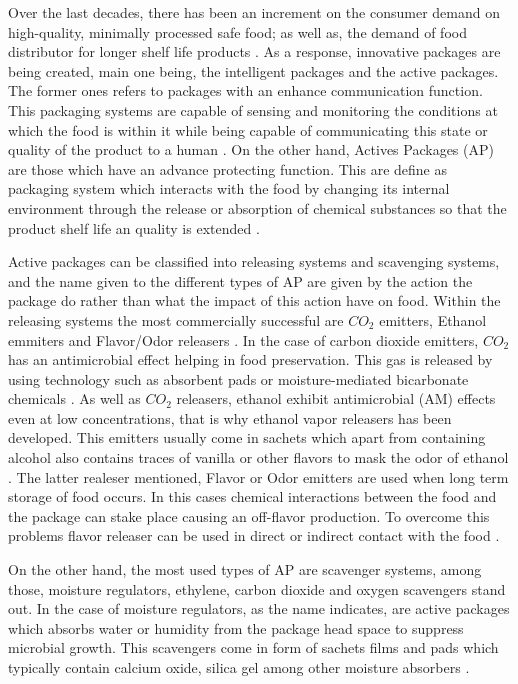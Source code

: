 \begin{refsection}
 Over the last decades, there has been an increment on the consumer demand on high-quality, minimally processed safe food; as well as, the demand of  food distributor for longer shelf life products \cite{Yildirim2018ActivePackaging}.  As a response, innovative packages are being created, main one being, the intelligent packages and the active packages.  The former ones refers to packages with an enhance communication function.  This packaging systems are capable of sensing and monitoring the conditions at which the food is within it while being capable of communicating this state or quality of the product to a human \cites{Yam2005IntelligentApplications}{Kruijf2002ActiveAspects}. On the other hand, Actives Packages (AP) are those which have an advance protecting function. This are define as packaging system which interacts with the food by changing its internal environment through the release or absorption of chemical substances so that the product shelf life an quality is extended \cites{brody2001active}{Yildirim2018ActivePackaging}.
 
 Active packages can be classified into releasing systems and scavenging systems, and the name given to the different types of AP are given by the action the package do rather than what the impact of this action have on food. Within the releasing systems the most commercially successful are $CO_2$ emitters, Ethanol emmiters and Flavor/Odor releasers \cites{robertson2016food}{PereiradeAbreu2012ActiveIndustry}. In the case of carbon dioxide emitters, $CO_2$  has an antimicrobial effect helping in food preservation. This  gas is released by using technology such as absorbent pads or moisture-mediated bicarbonate chemicals \cite{Emanuel2019FoodPerspective}. As well as $CO_2$ releasers, ethanol exhibit antimicrobial (AM) effects even at low concentrations, that is why ethanol vapor releasers has been developed. This emitters usually come in sachets which apart from containing alcohol also contains traces of vanilla or other flavors to mask the odor of ethanol \cite{robertson2016food}. The latter realeser mentioned, Flavor or Odor emitters are used when long term storage of food occurs. In this cases chemical interactions between the food and the package can stake place causing an off-flavor production. To overcome this problems flavor releaser can be used in direct or indirect contact with the food \cite{Ahmed2017AFoods}.
 
On the other hand, the most used types of AP are scavenger systems, among those, moisture regulators, ethylene, carbon dioxide and oxygen scavengers stand out. In the case of moisture regulators, as the name indicates, are active packages which absorbs water or humidity from the package head space to suppress microbial growth. This scavengers come in form of sachets films and pads which typically contain calcium oxide, silica gel among other moisture absorbers \cite{Gaikwad2019MoistureApplications}. 


\end{refsection}
